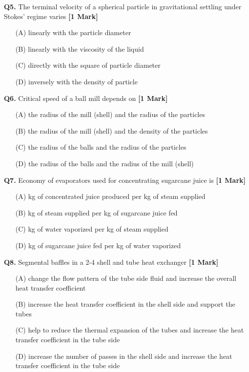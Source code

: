 \documentclass[11pt]{article}
\newcommand{\questiona}[2]{
    \noindent\textbf{Q#2.} #1 \hfill \textbf{[1 Mark]}
}
\begin{document}
\questiona{The terminal velocity of a spherical particle in gravitational settling under Stokes' regime varies}{5}
\begin{enumerate}
    \item[(A)] linearly with the particle diameter  
    \item[(B)] linearly with the viscosity of the liquid  
    \item[(C)] directly with the square of particle diameter  
    \item[(D)] inversely with the density of particle  
\end{enumerate}

\questiona{Critical speed of a ball mill depends on}{6}
\begin{enumerate}
    \item[(A)] the radius of the mill (shell) and the radius of the particles  
    \item[(B)] the radius of the mill (shell) and the density of the particles  
    \item[(C)] the radius of the balls and the radius of the particles  
    \item[(D)] the radius of the balls and the radius of the mill (shell)  
\end{enumerate}

\questiona{Economy of evaporators used for concentrating sugarcane juice is}{7}
\begin{enumerate}
    \item[(A)] kg of concentrated juice produced per kg of steam supplied  
    \item[(B)] kg of steam supplied per kg of sugarcane juice fed  
    \item[(C)] kg of water vaporized per kg of steam supplied  
    \item[(D)] kg of sugarcane juice fed per kg of water vaporized  
\end{enumerate}

\questiona{Segmental baffles in a 2-4 shell and tube heat exchanger}{8}
\begin{enumerate}
    \item[(A)] change the flow pattern of the tube side fluid and increase the overall heat transfer coefficient  
    \item[(B)] increase the heat transfer coefficient in the shell side and support the tubes  
    \item[(C)] help to reduce the thermal expansion of the tubes and increase the heat transfer coefficient in the tube side  
    \item[(D)] increase the number of passes in the shell side and increase the heat transfer coefficient in the tube side  
\end{enumerate}
\end{document}
